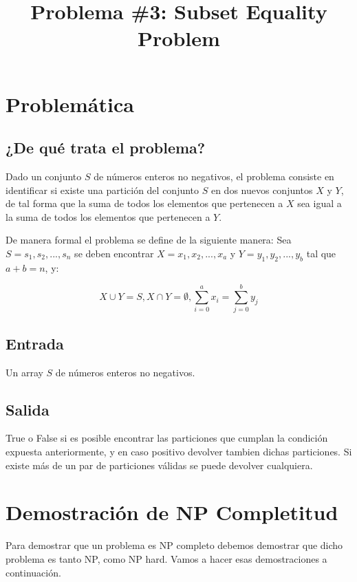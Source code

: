 \documentclass[11pt]{article}
\title{Problema \#3: Subset Equality Problem}
\begin{document}
    \maketitle
    \newpage

    \tableofcontents
    \newpage

    \section{Problemática}
    \subsection{¿De qué trata el problema?}
    Dado un conjunto $S$ de números enteros no negativos, el problema consiste en identificar si existe una
    partición del conjunto $S$ en dos nuevos conjuntos $X$ y $Y$, de tal forma que la suma de todos los elementos
    que pertenecen a $X$ sea igual a la suma de todos los elementos que pertenecen a $Y$.

    De manera formal el problema se define de la siguiente manera: Sea $S = {s_1, s_2, ... ,s_n}$ se deben
    encontrar $X = x_1, x_2, ... , x_a$ y $Y = y_1, y_2, ... ,y_b$ tal que $a+b=n$, y:

    \[
    X \cup Y = S, X \cap Y= \emptyset, \sum_{i=0}^{a} x_i = \sum_{j=0}^b y_j
    \]
    
    \subsection{Entrada}
    Un array $S$ de números enteros no negativos.
    
    \subsection{Salida}
    True o False si es posible encontrar las particiones que cumplan la condición expuesta anteriormente, y en
    caso positivo devolver tambien dichas particiones. Si existe más de un par de particiones válidas se puede 
    devolver cualquiera.

    \section{Demostración de NP Completitud}
    Para demostrar que un problema es NP completo debemos demostrar que dicho problema es tanto NP, como NP hard.
    Vamos a hacer esas demostraciones a continuación.
\end{document}
